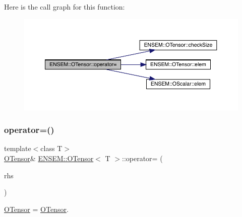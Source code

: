 Here is the call graph for this function\+:
\nopagebreak
\begin{figure}[H]
\begin{center}
\leavevmode
\includegraphics[width=350pt]{da/d8a/classENSEM_1_1OTensor_ae763ca68be1d6b8d5b27b8d544ab5f2d_cgraph}
\end{center}
\end{figure}
\mbox{\label{classENSEM_1_1OTensor_a08690a1808269fccd113a9d634c7a73f}} 
\subsubsection{\texorpdfstring{operator=()}{operator=()}\hspace{0.1cm}{\footnotesize\ttfamily [5/8]}}
{\footnotesize\ttfamily template$<$class T$>$ \\
\mbox{\hyperlink{classENSEM_1_1OTensor}{O\+Tensor}}\& \mbox{\hyperlink{classENSEM_1_1OTensor}{E\+N\+S\+E\+M\+::\+O\+Tensor}}$<$ T $>$\+::operator= (\begin{DoxyParamCaption}\item[{const \mbox{\hyperlink{classENSEM_1_1OTensor}{O\+Tensor}}$<$ T $>$ \&}]{rhs }\end{DoxyParamCaption})\hspace{0.3cm}{\ttfamily [inline]}}



\mbox{\hyperlink{classENSEM_1_1OTensor}{O\+Tensor}} = \mbox{\hyperlink{classENSEM_1_1OTensor}{O\+Tensor}}. 

